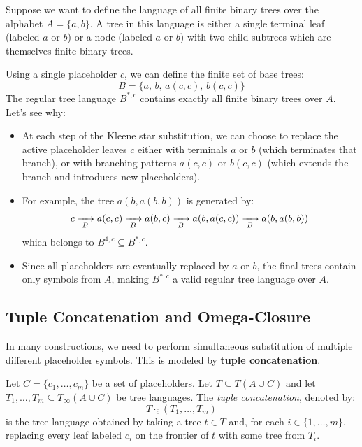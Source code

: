\begin{example}
Suppose we want to define the language of all finite binary trees over the alphabet $A = \{a, b\}$. A tree in this language is either a single terminal leaf (labeled $a$ or $b$) or a node (labeled $a$ or $b$) with two child subtrees which are themselves finite binary trees.

Using a single placeholder $c$, we can define the finite set of base trees:
$$B = \{ a, \, b, \, a(c, c), \, b(c, c) \}$$
The regular tree language $B^{*, c}$ contains exactly all finite binary trees over $A$. Let's see why:
\begin{itemize}
    \item At each step of the Kleene star substitution, we can choose to replace the active placeholder leaves $c$ either with terminals $a$ or $b$ (which terminates that branch), or with branching patterns $a(c, c)$ or $b(c, c)$ (which extends the branch and introduces new placeholders).
    \item For example, the tree $a(b, a(b, b))$ is generated by:
    $$c \xrightarrow[{\;B\;}]{} a(c, c) \xrightarrow[{\;B\;}]{} a(b, c) \xrightarrow[{\;B\;}]{} a(b, a(c, c)) \xrightarrow[{\;B\;}]{} a(b, a(b, b))$$
    which belongs to $B^{4, c} \subseteq B^{*, c}$.
    \item Since all placeholders are eventually replaced by $a$ or $b$, the final trees contain only symbols from $A$, making $B^{*, c}$ a valid regular tree language over $A$.
\end{itemize}
\end{example}


\subsection{Tuple Concatenation and Omega-Closure}
In many constructions, we need to perform simultaneous substitution of multiple different placeholder symbols. This is modeled by \textbf{tuple concatenation}.

\begin{definition}
Let $C = \{c_1, \dots, c_m\}$ be a set of placeholders. Let $T \subseteq T(A \cup C)$ and let $T_1, \dots, T_m \subseteq T_\infty(A \cup C)$ be tree languages. The \emph{tuple concatenation}, denoted by:
$$T \cdot_{\bar{c}} (T_1, \dots, T_m)$$
is the tree language obtained by taking a tree $t \in T$ and, for each $i \in \{1, \dots, m\}$, replacing every leaf labeled $c_i$ on the frontier of $t$ with some tree from $T_i$.
\end{definition}

